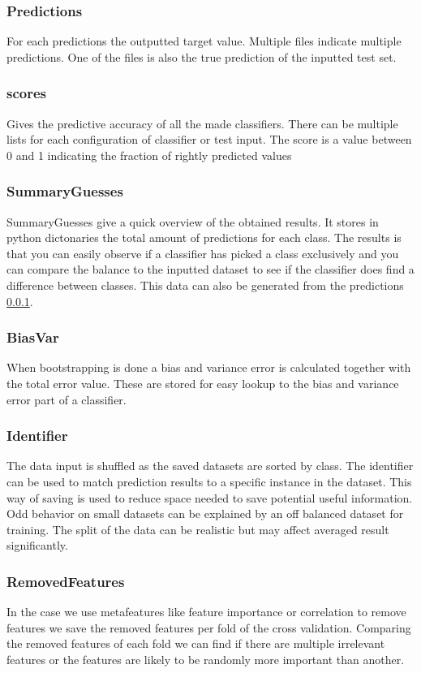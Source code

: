 \documentclass[a4paper,10pt]{article}
\begin{document}
\subsubsection{Predictions}\label{pred}
For each predictions the outputted target value. Multiple files indicate multiple predictions. One of the files is also the true prediction of the inputted test set. 

\subsubsection{scores}
Gives the predictive accuracy of all the made classifiers. There can be multiple lists for each configuration of classifier or test input. The score is a value between 0 and 1 indicating the fraction of rightly predicted values

\subsubsection{SummaryGuesses}
SummaryGuesses give a quick overview of the obtained results. It stores in python dictonaries the total amount of predictions for each class. The results is that you can easily observe if a classifier has picked a class exclusively and you can compare the balance to the inputted dataset to see if the classifier does find a difference between classes. This data can also be generated from the predictions \ref{pred}.

\subsubsection{BiasVar}
When bootstrapping is done a bias and variance error is calculated together with the total error value. These are stored for easy lookup to the bias and variance error part of a classifier.

\subsubsection{Identifier}
The data input is shuffled as the saved datasets are sorted by class. The identifier can be used to match prediction results to a specific instance in the dataset. This way of saving is used to reduce space needed to save potential useful information. Odd behavior on small datasets can be explained by an off balanced dataset for training. The split of the data can be realistic but may affect averaged result significantly. 

\subsubsection{RemovedFeatures}
In the case we use metafeatures like feature importance or correlation to remove features we save the removed features per fold of the cross validation. Comparing the removed features of each fold we can find if there are multiple irrelevant features or the features are likely to be randomly more important than another.
\end{document}
